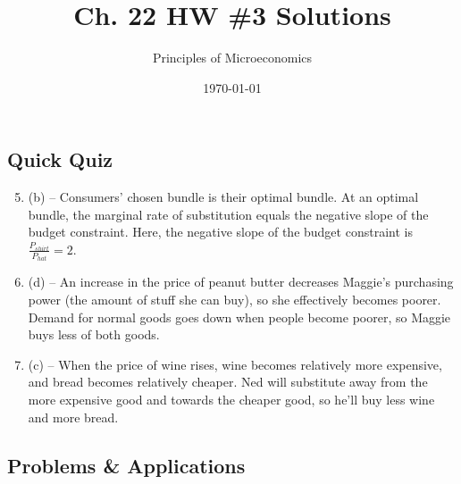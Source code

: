 \documentclass{article}
\title{Ch. 22 HW \#3 Solutions}
\author{Principles of Microeconomics}
\date{\today}
\begin{document}
\maketitle

\subsection*{Quick Quiz}

\begin{enumerate}
\setcounter{enumi}{4}

\item (b) -- Consumers' chosen bundle is their optimal bundle. At an optimal bundle, the marginal rate of substitution equals the negative slope of the budget constraint. Here, the negative slope of the budget constraint is \\ $\frac{P_{shirt}}{P_{hat}} = 2$.

\item (d) -- An increase in the price of peanut butter decreases Maggie's purchasing power (the amount of stuff she can buy), so she effectively becomes poorer. Demand for normal goods goes down when people become poorer, so Maggie buys less of both goods.

\item (c) -- When the price of wine rises, wine becomes relatively more expensive, and bread becomes relatively cheaper. Ned will substitute away from the more expensive good and towards the cheaper good, so he'll buy less wine and more bread.

\end{enumerate}

\subsection*{Problems \& Applications}
\end{document}
